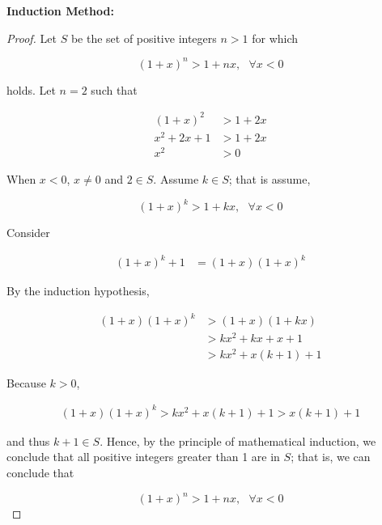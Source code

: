 \documentclass{article}
\begin{document}
    \textbf{Induction Method:}
    \begin{proof}
        Let $S$ be the set of positive integers $n>1$ for which

        \[
            (1+x)^n > 1+nx, \text{ } \forall x < 0
        \]

        holds. Let $n=2$ such that

        \begin{align*}
            (1+x)^2      &> 1 + 2x \\
            x^2 + 2x + 1 &> 1 + 2x \\
            x^2          &> 0
        \end{align*}

        When $x<0$, $x\not = 0$ and $2\in S$. Assume $k\in S$; that is assume,

        \[
            (1+x)^k > 1 + kx, \text{ } \forall x < 0
        \]

        Consider

        \begin{align*}
            (1+x)^k + 1     &= (1+x)(1+x)^k
        \end{align*}

        By the induction hypothesis,

        \begin{align*}
            (1+x)(1+x)^k    &> (1+x)(1+kx) \\
                            &> kx^2 + kx + x + 1 \\
                            &> kx^2 + x(k+1) + 1
        \end{align*}

        Because $k>0$,

        \begin{align*}
            (1+x)(1+x)^k > kx^2 + x(k+1) + 1 > x(k+1) + 1
        \end{align*}

        and thus $k+1\in S$. Hence, by the principle of mathematical induction, we conclude that all positive integers greater than 1 are in $S$; that is, we can conclude that

        \[
            (1+x)^n > 1 + nx, \text{ } \forall x < 0
        \]
    \end{proof}
\end{document}
